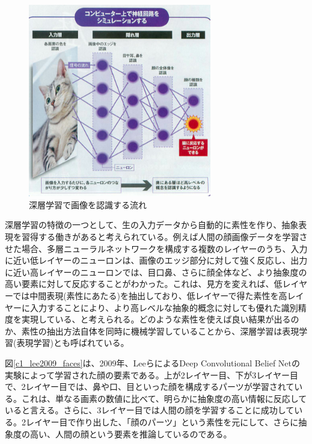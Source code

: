 \begin{figure}[tbp]
 \begin{center}
  \includegraphics[width=80mm]{img/c1/nikkei}
 \end{center}
 \caption{深層学習で画像を認識する流れ}
 \label{c1_nikkei}
\end{figure}
深層学習の特徴の一つとして、生の入力データから自動的に素性を作り、抽象表現を習得する働きがあると考えられている。例えば人間の顔画像データを学習させた場合、多層ニューラルネットワークを構成する複数のレイヤーのうち、入力に近い低レイヤーのニューロンは、画像のエッジ部分に対して強く反応し、出力に近い高レイヤーのニューロンでは、目口鼻、さらに顔全体など、より抽象度の高い要素に対して反応することがわかった。これは、見方を変えれば、低レイヤーでは中間表現(素性にあたる)を抽出しており、低レイヤーで得た素性を高レイヤーに入力することにより、より高レベルな抽象的概念に対しても優れた識別精度を実現している、と考えられる。どのような素性を使えば良い結果が出るのか、素性の抽出方法自体を同時に機械学習していることから、深層学習は表現学習(表現学習)とも呼ばれている。\par
図\ref{c1_lee2009_faces}は、2009年、LeeらによるDeep Convolutional Belief Netの実験によって学習された顔の要素である。上が2レイヤー目、下が3レイヤー目で、2レイヤー目では、鼻や口、目といった顔を構成するパーツが学習されている。これは、単なる画素の数値に比べて、明らかに抽象度の高い情報に反応していると言える。さらに、3レイヤー目では人間の顔を学習することに成功している。2レイヤー目で作り出した、「顔のパーツ」という素性を元にして、さらに抽象度の高い、人間の顔という要素を推論しているのである。\cite{lee2009convolutional}
